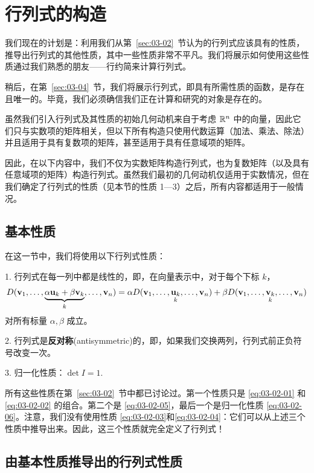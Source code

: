 \section{行列式的构造}\label{sec:03-03}

我们现在的计划是：利用我们从第~\ref{sec:03-02}~节认为的行列式应该具有的性质，推导出行列式的其他性质，其中一些性质非常不平凡。我们将展示如何使用这些性质通过我们熟悉的朋友——行约简来计算行列式。

稍后，在第~\ref{sec:03-04}~节，我们将展示行列式，即具有所需性质的函数，是存在且唯一的。毕竟，我们必须确信我们正在计算和研究的对象是存在的。

虽然我们引入行列式及其性质的初始几何动机来自于考虑 $\mathbb{R}^n$ 中的向量，因此它们只与实数项的矩阵相关，但以下所有构造只使用代数运算（加法、乘法、除法）并且适用于具有复数项的矩阵，甚至适用于具有任意域项的矩阵。

因此，在以下内容中，我们不仅为实数矩阵构造行列式，也为复数矩阵（以及具有任意域项的矩阵）构造行列式。虽然我们最初的几何动机仅适用于实数情况，但在我们确定了行列式的性质（见本节的性质 1—3）之后，所有内容都适用于一般情况。

\subsection{基本性质}\label{sec:03-03-01}

在这一节中，我们将使用以下行列式性质：

1. 行列式在每一列中都是线性的，即，在向量表示中，对于每个下标 $k$，
$$
D(\mathbf{v}_1, \dots, \underset{k}{\underbrace{\alpha \mathbf{u}_k + \beta \mathbf{v}_k}}, \dots, \mathbf{v}_n) = \alpha D(\mathbf{v}_1, \dots, \underset{k}{\mathbf{u}_k}, \dots, \mathbf{v}_n) + \beta D(\mathbf{v}_1, \dots, \underset{k}{\mathbf{v}_k}, \dots, \mathbf{v}_n)
$$
对所有标量 $\alpha, \beta$ 成立。

2. 行列式是\textbf{反对称}(antisymmetric)的，即，如果我们交换两列，行列式前正负符号改变一次。

3. 归一化性质：$\det I = 1$.~

所有这些性质在第~\ref{sec:03-02}~节中都已讨论过。第一个性质只是 \eqref{eq:03-02-01} 和 \eqref{eq:03-02-02} 的组合。第二个是 \eqref{eq:03-02-05}，最后一个是归一化性质 \eqref{eq:03-02-06}。注意，我们没有使用性质 \eqref{eq:03-02-03}和\eqref{eq:03-02-04}：它们可以从上述三个性质中推导出来。因此，这三个性质就完全定义了行列式！

\subsection{由基本性质推导出的行列式性质}\label{sec:03-03-02}

